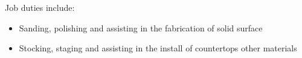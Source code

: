 \normalsize
Job duties include:
\small
\begin{itemize}
    \item Sanding, polishing and assisting in the fabrication of solid surface
    \item Stocking, staging and assisting in the install of countertops other materials
\end{itemize}
\normalsize
\medskip
